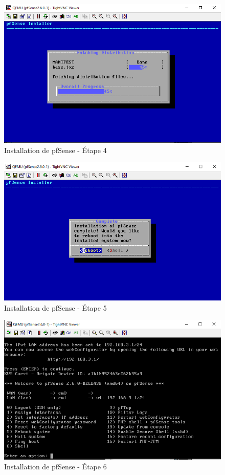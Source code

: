 \begin{figure}[H]
\centering
\includegraphics[width=15cm]{Images/BRadesMelian-Topologie6.png}
\caption{Installation de pfSense - Étape 4}
\label{Chap3.3.6}
\end{figure}

\begin{figure}[H]
\centering
\includegraphics[width=15cm]{Images/BRadesMelian-Topologie7.png}
\caption{Installation de pfSense - Étape 5}
\label{Chap3.3.7}
\end{figure}

\begin{figure}[H]
\centering
\includegraphics[width=15cm]{Images/BRadesMelian-Topologie8.png}
\caption{Installation de pfSense - Étape 6}
\label{Chap3.3.8}
\end{figure}

